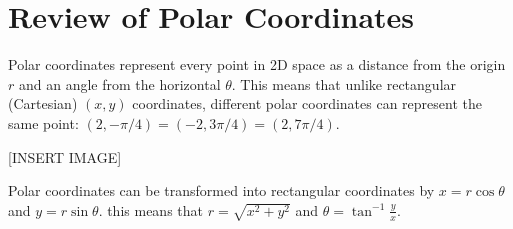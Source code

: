 \section{Review of Polar Coordinates}
\noindent
Polar coordinates represent every point in 2D space as a distance from the origin $r$ and an angle from the horizontal $\theta$. This means that unlike rectangular (Cartesian) $(x,y)$ coordinates, different polar coordinates can represent the same point: $(2,-\pi/4)=(-2,3\pi/4)=(2,7\pi/4)$.

[INSERT IMAGE]

\noindent
Polar coordinates can be transformed into rectangular coordinates by $x=r\cos{\theta}$ and $y=r\sin{\theta}$. this means that $r=\sqrt{x^2+y^2}$ and $\theta=\tan^{-1}{\frac{y}{x}}$.



